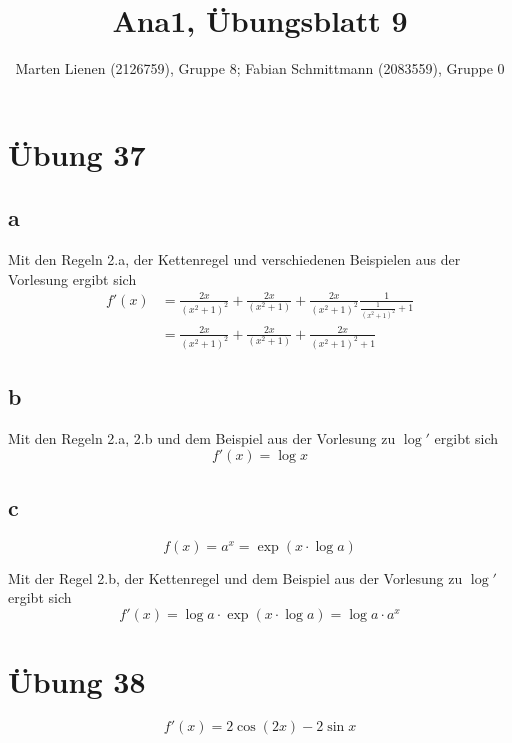 \documentclass[a4paper,10pt]{article}
\title{Ana1, Übungsblatt 9}
\author{Marten Lienen (2126759), Gruppe 8; Fabian Schmittmann (2083559), Gruppe 0}
\begin{document}
\maketitle

\section*{Übung 37}

\subsection*{a}

Mit den Regeln 2.a, der Kettenregel und verschiedenen Beispielen aus der Vorlesung ergibt sich
\begin{align*}
 f'(x) & = \frac{2x}{(x^2 + 1)^2} + \frac{2x}{(x^2 + 1)} + \frac{2x}{(x^2 + 1)^2}\frac{1}{\frac{1}{(x^2 + 1)^2} + 1}\\
 & = \frac{2x}{(x^2 + 1)^2} + \frac{2x}{(x^2 + 1)} + \frac{2x}{(x^2 + 1)^2 + 1}
\end{align*}

\subsection*{b}

Mit den Regeln 2.a, 2.b und dem Beispiel aus der Vorlesung zu $\log'$ ergibt sich
\begin{equation}
 f'(x) = \log x
\end{equation}

\subsection*{c}

\begin{equation}
 f(x) = a^x = \exp(x \cdot \log a)
\end{equation}

Mit der Regel 2.b, der Kettenregel und dem Beispiel aus der Vorlesung zu $\log'$ ergibt sich
\begin{equation}
 f'(x) = \log a \cdot \exp(x \cdot \log a) = \log a \cdot a^x
\end{equation}

\section*{Übung 38}

\begin{equation}
 f'(x) = 2\cos (2x) - 2\sin x
\end{equation}
\end{document}

